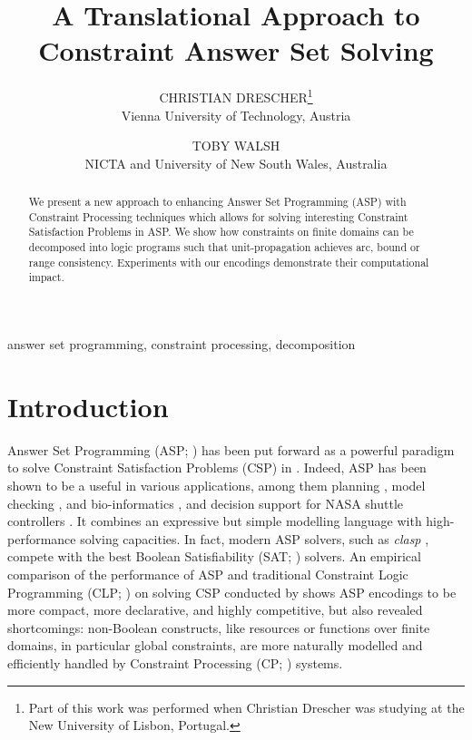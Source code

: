 \documentclass{tlp}
\newcommand{\systemname}[1]{\emph{#1}}
\begin{document}
\title[A Translational Approach to Constraint Answer Set Solving]
{A Translational Approach to\\ Constraint Answer Set Solving}

\author[C. Drescher and T. Walsh]
{CHRISTIAN DRESCHER\thanks{Part of this work was performed when Christian Drescher was studying at the New University of Lisbon, Portugal.} \\
Vienna University of Technology, Austria
\and TOBY WALSH \\
NICTA and University of New South Wales, Australia
}



\maketitle


\begin{abstract}
We present a new approach to enhancing Answer Set Programming (ASP) with Constraint Processing techniques which allows for solving interesting Constraint Satisfaction Problems in ASP. We show how constraints on finite domains can be decomposed into logic programs such that unit-propagation achieves arc, bound or range consistency.
Experiments with our encodings demonstrate their computational impact.
\end{abstract}

\begin{keywords}
 answer set programming, constraint processing, decomposition
\end{keywords}


\section{Introduction}

Answer Set Programming (ASP; ) has been put forward as a powerful paradigm to solve Constraint Satisfaction Problems (CSP) in \cite{niemela99a}. Indeed, ASP has been shown to be a useful in various applications, among them planning \cite{lifschitz99b}, model checking \cite{helnie03a}, and bio-informatics \cite{bachtrtrjobe04a}, and decision support for NASA shuttle controllers \cite{nobagewaba01a}. It combines an expressive but simple modelling language with high-performance solving capacities. In fact, modern ASP solvers, such as \systemname{clasp} \cite{gekanesc07b}, compete with the best Boolean Satisfiability (SAT; ) solvers.
An empirical comparison of the performance of ASP and traditional Constraint Logic Programming (CLP; ) on solving CSP conducted by  shows ASP encodings to be more compact, more declarative, and highly competitive, but also revealed shortcomings: non-Boolean constructs, like resources or functions over finite domains, in particular global constraints, are more naturally modelled and efficiently handled by Constraint Processing (CP; ) systems.
\end{document}
